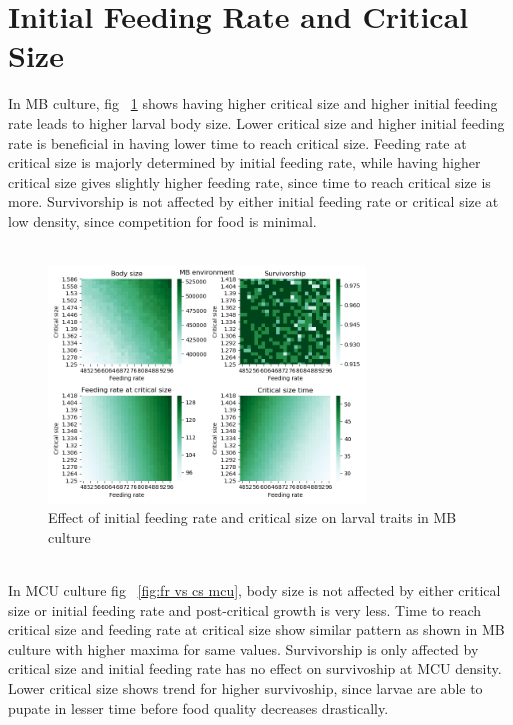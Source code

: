 \section{Initial Feeding Rate and Critical Size}
In MB culture, fig ~\ref{fig:fr vs cs mb} shows having higher critical size and higher initial feeding rate leads to higher larval body size. Lower critical size and higher initial feeding rate is beneficial in having lower time to reach critical size. Feeding rate at critical size is majorly determined by initial feeding rate, while having higher critical size gives slightly higher feeding rate, since time to reach critical size is more. Survivorship is not affected by either initial feeding rate or critical size at low density, since competition for food is minimal. \\ \\
\begin{figure}[h]
  \centering
  \includegraphics[width=0.75\textwidth]{C3/Figs/Critical size_vs_Feeding rate_MB}
  \caption{Effect of initial feeding rate and critical size on larval traits in MB culture}
  \label{fig:fr vs cs mb}
\end{figure}\\
In MCU culture fig ~\ref{fig:fr vs cs mcu}, body size is not affected by either critical size or initial feeding rate and post-critical growth is very less. Time to reach critical size and feeding rate at critical size show similar pattern as shown in MB culture with higher maxima for same values. Survivorship is only affected by critical size and initial feeding rate has no effect on survivoship at MCU density. Lower critical size shows trend for higher survivoship, since larvae are able to pupate in lesser time before food quality decreases drastically.\\ \\
